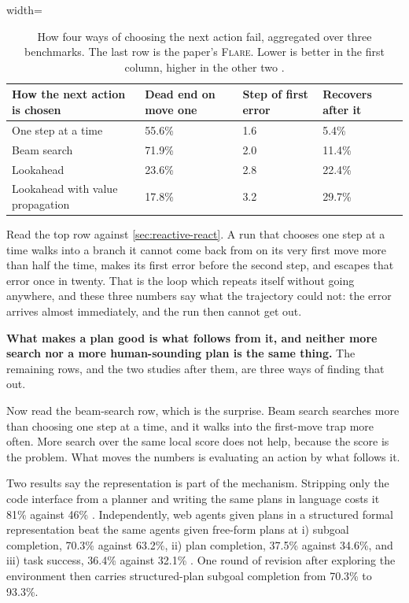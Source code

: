 \begin{table}[tbp]
  \caption{How four ways of choosing the next action fail, aggregated over three benchmarks. The
  last row is the paper's \textsc{Flare}. Lower is better in the first column, higher in the other
  two \citep[Table~3]{wang2026reasoningplan}.}
  \label{tab:planning-failure}
  \begin{adjustbox}{width=\linewidth}\begin{tabularx}{\linewidth}{XXXX}
    \toprule
    How the next action is chosen & Dead end on move one & Step of first error & Recovers after it \\
    \midrule
    One step at a time & 55.6\% & 1.6 & 5.4\% \\
    Beam search & 71.9\% & 2.0 & 11.4\% \\
    Lookahead & 23.6\% & 2.8 & 22.4\% \\
    Lookahead with value propagation & 17.8\% & 3.2 & 29.7\% \\
    \bottomrule
  \end{tabularx}\end{adjustbox}
\end{table}

Read the top row against \cref{sec:reactive-react}. A run that chooses one step at a time walks into
a branch it cannot come back from on its very first move more than half the time, makes its first
error before the second step, and escapes that error once in twenty. That is the loop which repeats
itself without going anywhere, and these three numbers say what the trajectory could not: the error
arrives almost immediately, and the run then cannot get out.

\textbf{What makes a plan good is what follows from it, and neither more search nor a more
human-sounding plan is the same thing.} The remaining rows, and the two studies after them, are
three ways of finding that out.

Now read the beam-search row, which is the surprise. Beam search searches more than choosing one
step at a time, and it walks into the first-move trap more often. More search over the same
local score does not help, because the score is the problem. What moves the numbers is evaluating an
action by what follows it.

Two results say the representation is part of the mechanism. Stripping only the code interface from
a planner and writing the same plans in language costs it 81\% against 46\%
\citep[Figure~4c]{sun2023adaplanner}. Independently, web agents given plans in a structured formal
representation beat the same agents given free-form plans at i) subgoal completion, 70.3\% against
63.2\%, ii) plan completion, 37.5\% against 34.6\%, and iii) task success, 36.4\% against 32.1\%
\citep[Figure~3]{aghzal2026webagents}. One round of revision after exploring the environment then
carries structured-plan subgoal completion from 70.3\% to 93.3\%.

